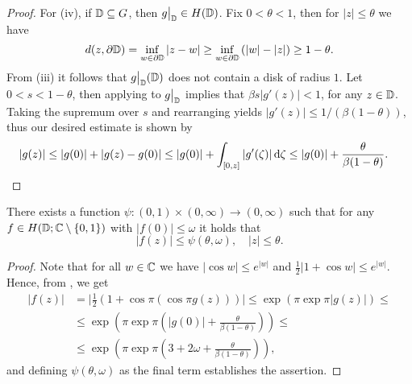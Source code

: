 \begin{proof}
    For (iv), if $\mathbb{D} \subseteq G$, then $\restr{g}{\D} \in H(\D)$. Fix $0 < \theta < 1$, then for $\vert z \vert \leq \theta$ we have
    $$ d(z, \partial \mathbb{D}) = \inf_{w \in \partial \mathbb{D}} \vert z - w \vert \geq \inf_{w \in \partial \mathbb{D}} \left( \vert w \vert - \vert z \vert \right) \geq 1 - \theta. $$
    From (iii) it follows that $\restr{g}{\D}(\D)$ does not contain a disk of radius $1$. Let $0 < s < 1 - \theta$, then applying  to $\restr{g}{\D}$ implies that $\beta s \vert g'(z) \vert < 1$, for any $z \in \mathbb{D}$. Taking the supremum over $s$ and rearranging yields $ \vert g'(z) \vert \leq 1 / (\beta (1 - \theta))$, thus our desired estimate is shown by
    \begin{align*}
        \vert g(z) \vert &\leq \vert g(0) \vert + \vert g(z) - g(0) \vert \leq \vert g(0) \vert + \int_{[0, z]} \vert g'(\zeta) \vert \mathop{}\!\mathrm{d} \zeta \leq \vert g(0) \vert + \frac{\theta}{\beta (1 - \theta)}. \qedhere
    \end{align*}
\end{proof}

\begin{theorem}[Schottky] \label{thm:schottky}
    There exists a function ${\psi : (0, 1) \times (0, \infty) \to (0, \infty)}$ such that for any $f \in H(\mathbb{D}; \mathbb{C} \setminus \{ 0, 1 \})$ with $\vert f(0) \vert \leq \omega$ it holds that
    \begin{equation}
        \vert f(z) \vert \leq \psi(\theta, \omega), \quad \vert z \vert \leq \theta.
    \end{equation}
\end{theorem}

\begin{proof}
    Note that for all $w \in \mathbb{C}$ we have $\vert \cos w \vert \leq e^{\vert w \vert}$ and $\frac{1}{2} \vert 1 + \cos w \vert \leq e^{\vert w \vert}$. Hence, from , we get
    \begin{align*}
        \vert f(z) \vert &= \vert {\textstyle \frac{1}{2}} ( 1 + \cos \pi ( \cos \pi g(z) ) ) \vert \leq \exp ( \pi \exp \pi \vert g(z) \vert ) \leq \\ &\leq \exp \left(\pi \exp \pi \left( \vert g(0) \vert + \frac{\theta}{\beta(1 - \theta)} \right) \right) \leq \\
        &\leq \exp \left( \pi \exp \pi \left( 3 + 2 \omega + \frac{\theta}{\beta(1 - \theta)} \right) \right),
    \end{align*}
    and defining $\psi(\theta, \omega)$ as the final term establishes the assertion.
\end{proof}

